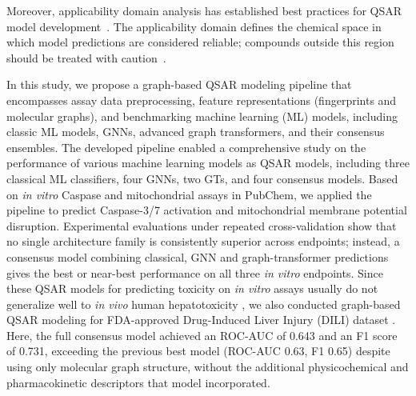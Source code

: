\documentclass[letterpaper]{article}
\begin{document}
Moreover, applicability domain analysis has established best practices for QSAR model development~\cite{Tropsha2010}. The applicability domain defines the chemical space in which model predictions are considered reliable; compounds outside this region should be treated with caution~\cite{Zhu2016}. 


In this study, we propose a graph-based QSAR modeling pipeline that encompasses assay data preprocessing, feature representations (fingerprints and molecular graphs), and benchmarking machine learning (ML) models, including classic ML models, GNNs, advanced graph transformers, and their consensus ensembles.
The developed pipeline enabled a comprehensive study on the performance of various machine learning models as QSAR models, including three classical ML classifiers, four GNNs, two GTs, and four consensus models. Based on \emph{in vitro} Caspase and mitochondrial assays in PubChem, we applied the pipeline to predict Caspase-3/7 activation and mitochondrial membrane potential disruption. Experimental evaluations under repeated cross-validation show that no single architecture family is consistently superior across endpoints; instead, a consensus model combining classical, GNN and graph-transformer predictions gives the best or near-best performance on all three \emph{in vitro} endpoints. Since these QSAR models for predicting toxicity on \emph{in vitro} assays usually do not generalize well to \emph{in vivo} human hepatotoxicity \cite{Zhu2016}, we also conducted graph-based QSAR modeling for FDA-approved Drug-Induced Liver Injury (DILI) dataset \cite{seal2024improved}. Here, the full consensus model achieved an ROC-AUC of 0.643 and an F1 score of 0.731, exceeding the previous best model (ROC-AUC 0.63, F1 0.65) despite using only molecular graph structure, without the additional physicochemical and pharmacokinetic descriptors that model incorporated.
\end{document}

